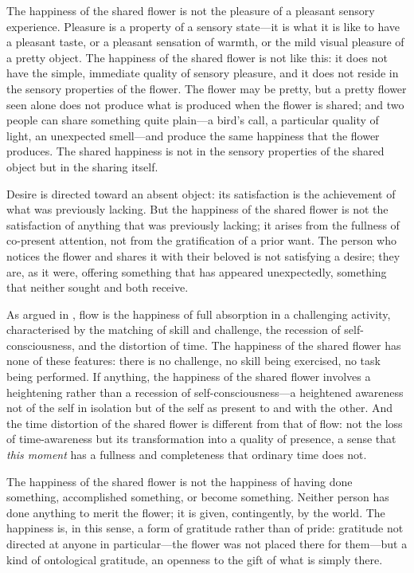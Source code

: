  The happiness of the shared flower is not the pleasure of a pleasant sensory experience. Pleasure is a property of a sensory state---it is what it is like to have a pleasant taste, or a pleasant sensation of warmth, or the mild visual pleasure of a pretty object. The happiness of the shared flower is not like this: it does not have the simple, immediate quality of sensory pleasure, and it does not reside in the sensory properties of the flower. The flower may be pretty, but a pretty flower seen alone does not produce what is produced when the flower is shared; and two people can share something quite plain---a bird's call, a particular quality of light, an unexpected smell---and produce the same happiness that the flower produces. The shared happiness is not in the sensory properties of the shared object but in the sharing itself.

 Desire is directed toward an absent object: its satisfaction is the achievement of what was previously lacking. But the happiness of the shared flower is not the satisfaction of anything that was previously lacking; it arises from the fullness of co-present attention, not from the gratification of a prior want. The person who notices the flower and shares it with their beloved is not satisfying a desire; they are, as it were, offering something that has appeared unexpectedly, something that neither sought and both receive.

 As argued in , flow is the happiness of full absorption in a challenging activity, characterised by the matching of skill and challenge, the recession of self-consciousness, and the distortion of time. The happiness of the shared flower has none of these features: there is no challenge, no skill being exercised, no task being performed. If anything, the happiness of the shared flower involves a heightening rather than a recession of self-consciousness---a heightened awareness not of the self in isolation but of the self as present to and with the other. And the time distortion of the shared flower is different from that of flow: not the loss of time-awareness but its transformation into a quality of presence, a sense that \emph{this moment} has a fullness and completeness that ordinary time does not.

 The happiness of the shared flower is not the happiness of having done something, accomplished something, or become something. Neither person has done anything to merit the flower; it is given, contingently, by the world. The happiness is, in this sense, a form of gratitude rather than of pride: gratitude not directed at anyone in particular---the flower was not placed there for them---but a kind of ontological gratitude, an openness to the gift of what is simply there.


